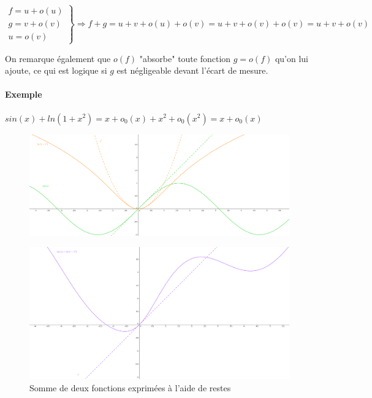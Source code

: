 \documentclass[]{article}
\begin{document}
\begin{enumerate}
	$$\left. \begin{array}{c}
		f = u + o(u) \\
		g = v + o(v) \\
		u=o(v)
	\end{array} \right\} \Longrightarrow f + g = u + v + o(u) + o(v) = u + v + o(v) + o(v) = u + v + o(v)$$

	On remarque également que $o(f)$ "absorbe" toute fonction $g=o(f)$ qu'on lui ajoute, ce qui est logique si $g$ est négligeable devant l'écart de mesure.

	\paragraph{Exemple}
	$sin(x)+ln(1+x^2)=x+o_0(x)+x^2+o_0(x^2)=x+o_0(x)$

	\begin{figure}[!h]
		\includegraphics[width=500pt]{Images/SommeResteGrossier1}
	\end{figure}

	\begin{figure}[!h]
		\includegraphics[width=500pt]{Images/SommeResteGrossier2}
		\caption{Somme de deux fonctions exprimées à l'aide de restes}
	\end{figure}
\end{enumerate}

\newpage
\end{document}
